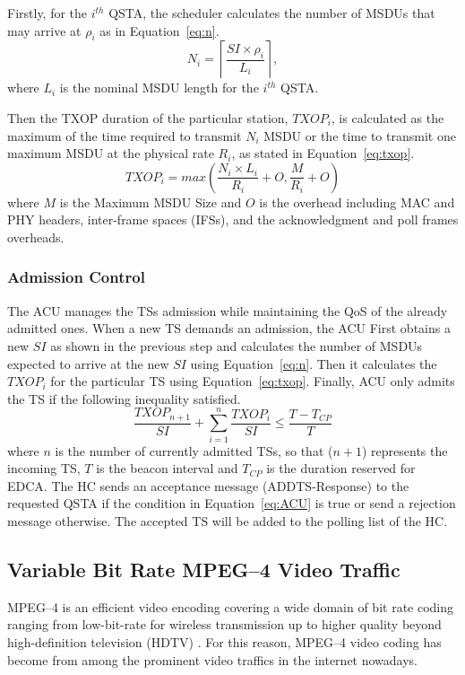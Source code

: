 \documentclass[a4paper, conference]{IEEEtran}
\begin{document}
Firstly, for the $i^{th}$ QSTA, the scheduler calculates the number of MSDUs that may arrive at $\rho_{i}$ as in Equation~\eqref{eq:n}.
\begin{equation}
N_{i}=\left \lceil \frac{SI\times\rho_{i}}{L_{i}} \right \rceil,
\label{eq:n}
\end{equation}
where $L_{i}$ is the nominal MSDU length for the $i^{th}$ QSTA.

Then the TXOP duration of the particular station, $TXOP_{i}$, is calculated as the maximum of the time required to transmit $N_{i}$ MSDU or the time to transmit one maximum MSDU at the physical rate $R_{i}$, as stated in Equation~\eqref{eq:txop}.
\begin{equation}
TXOP_{i}=max\left (\frac{N_{i} \times L_{i}}{R_{i}} + O, \frac{M}{R_{i}} + O \right)
\label{eq:txop}
\end{equation}
where $M$ is the Maximum MSDU Size and $O$ is the overhead including MAC and PHY headers, inter-frame spaces (IFSs), and the acknowledgment and poll frames overheads.
\subsubsection{Admission Control}
The ACU manages the TSs admission while maintaining the QoS of the already admitted ones. When a new TS demands an admission, the ACU First obtains a new $SI$ as shown in the previous step and calculates the number of MSDUs expected to arrive at the new $SI$ using Equation~\eqref{eq:n}. Then it calculates the $TXOP_{i}$ for the particular TS using Equation~\eqref{eq:txop}. Finally, ACU only admits the TS if the following inequality satisfied.
\begin{equation}
\label{eq:ACU}
\frac{TXOP_{n+1}}{SI}+\sum_{i=1}^{n} \frac{TXOP_{i}}{SI}\leq \frac{T- T_{CP}}{T}
\end{equation}
where $n$ is the number of currently admitted TSs, so that ($n+1$) represents the incoming TS, $T$ is the beacon interval and $T_{CP}$ is the duration reserved for EDCA. The HC sends an acceptance message (ADDTS-Response) to the requested QSTA if the condition in Equation~\eqref{eq:ACU} is true or send a rejection message otherwise. The accepted TS will be added to the polling list of the HC.
\subsection{Variable Bit Rate MPEG--4 Video Traffic}
\label{sec:VBRTraffic}
MPEG--4 is an efficient video encoding covering a wide domain of bit rate coding ranging from low-bit-rate for wireless transmission up to higher quality beyond high-definition television (HDTV) \cite{Fitzek2001}. For this reason, MPEG--4 video coding has become from among the prominent video traffics in the internet nowadays. 
\end{document}
